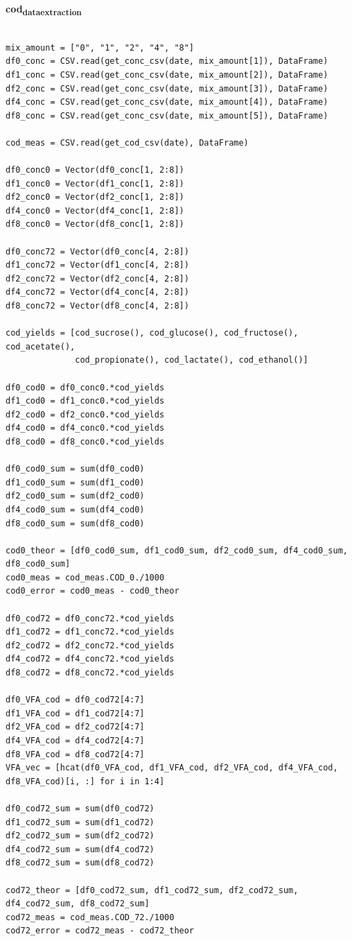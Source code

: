 \documentclass[11pt]{article}
\begin{document}
\textbf{cod\textsubscript{data}\textsubscript{extraction}}
\begin{verbatim}

mix_amount = ["0", "1", "2", "4", "8"]
df0_conc = CSV.read(get_conc_csv(date, mix_amount[1]), DataFrame)
df1_conc = CSV.read(get_conc_csv(date, mix_amount[2]), DataFrame)
df2_conc = CSV.read(get_conc_csv(date, mix_amount[3]), DataFrame)
df4_conc = CSV.read(get_conc_csv(date, mix_amount[4]), DataFrame)
df8_conc = CSV.read(get_conc_csv(date, mix_amount[5]), DataFrame)

cod_meas = CSV.read(get_cod_csv(date), DataFrame)

df0_conc0 = Vector(df0_conc[1, 2:8])
df1_conc0 = Vector(df1_conc[1, 2:8])
df2_conc0 = Vector(df2_conc[1, 2:8])
df4_conc0 = Vector(df4_conc[1, 2:8])
df8_conc0 = Vector(df8_conc[1, 2:8])

df0_conc72 = Vector(df0_conc[4, 2:8])
df1_conc72 = Vector(df1_conc[4, 2:8])
df2_conc72 = Vector(df2_conc[4, 2:8])
df4_conc72 = Vector(df4_conc[4, 2:8])
df8_conc72 = Vector(df8_conc[4, 2:8])

cod_yields = [cod_sucrose(), cod_glucose(), cod_fructose(), cod_acetate(),
              cod_propionate(), cod_lactate(), cod_ethanol()]

df0_cod0 = df0_conc0.*cod_yields
df1_cod0 = df1_conc0.*cod_yields
df2_cod0 = df2_conc0.*cod_yields
df4_cod0 = df4_conc0.*cod_yields
df8_cod0 = df8_conc0.*cod_yields

df0_cod0_sum = sum(df0_cod0)
df1_cod0_sum = sum(df1_cod0)
df2_cod0_sum = sum(df2_cod0)
df4_cod0_sum = sum(df4_cod0)
df8_cod0_sum = sum(df8_cod0)

cod0_theor = [df0_cod0_sum, df1_cod0_sum, df2_cod0_sum, df4_cod0_sum, df8_cod0_sum]
cod0_meas = cod_meas.COD_0./1000
cod0_error = cod0_meas - cod0_theor

df0_cod72 = df0_conc72.*cod_yields
df1_cod72 = df1_conc72.*cod_yields
df2_cod72 = df2_conc72.*cod_yields
df4_cod72 = df4_conc72.*cod_yields
df8_cod72 = df8_conc72.*cod_yields

df0_VFA_cod = df0_cod72[4:7]
df1_VFA_cod = df1_cod72[4:7]
df2_VFA_cod = df2_cod72[4:7]
df4_VFA_cod = df4_cod72[4:7]
df8_VFA_cod = df8_cod72[4:7]
VFA_vec = [hcat(df0_VFA_cod, df1_VFA_cod, df2_VFA_cod, df4_VFA_cod, df8_VFA_cod)[i, :] for i in 1:4]

df0_cod72_sum = sum(df0_cod72)
df1_cod72_sum = sum(df1_cod72)
df2_cod72_sum = sum(df2_cod72)
df4_cod72_sum = sum(df4_cod72)
df8_cod72_sum = sum(df8_cod72)

cod72_theor = [df0_cod72_sum, df1_cod72_sum, df2_cod72_sum, df4_cod72_sum, df8_cod72_sum]
cod72_meas = cod_meas.COD_72./1000
cod72_error = cod72_meas - cod72_theor

\end{verbatim}
\end{document}
